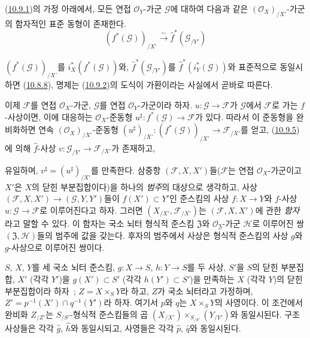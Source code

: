 \begin{proposition}[10.9.5]
\label{I.10.9.5-ko}
(\hyperref[I.10.9.1-ko]{10.9.1})의 가정 아래에서, 모든 연접
$\mathscr{O}_Y$-가군 $\mathscr{G}$에 대하여 다음과 같은
$(\mathscr{O}_X)_{/X'}$-가군의 함자적인 표준 동형이 존재한다.
\[
  (f^*(\mathscr{G}))_{/X'}\xrightarrow{\sim}
  \widehat f^*(\mathscr{G}_{/Y'})
\]
\end{proposition}

$(f^*(\mathscr{G}))_{/X'}$를 $i_X^*(f^*(\mathscr{G}))$와,
$\widehat f^*(\mathscr{G}_{/Y'})$를
$\widehat f^*(i_Y^*(\mathscr{G}))$와 표준적으로 동일시하면
(\hyperref[I.10.8.8-ko]{10.8.8}), 명제는
(\hyperref[I.10.9.2-ko]{10.9.2})의 도식이 가환이라는 사실에서 곧바로
따른다.

\begin{env}[10.9.6]
\label{I.10.9.6-ko}
이제 $\mathscr{F}$를 연접 $\mathscr{O}_X$-가군,
$\mathscr{G}$를 연접 $\mathscr{O}_Y$-가군이라 하자.
$u:\mathscr{G}\to\mathscr{F}$가 $\mathscr{G}$에서 $\mathscr{F}$로
가는 $f$-사상이면, 이에 대응하는 $\mathscr{O}_X$-준동형
$u^\sharp:f^*(\mathscr{G})\to\mathscr{F}$가 있다. 따라서 이 준동형을
완비화하면 연속 $(\mathscr{O}_X)_{/X'}$-준동형
$(u^\sharp)_{/X'}:(f^*(\mathscr{G}))_{/X'}\to\mathscr{F}_{/X'}$를
얻고, (\hyperref[I.10.9.5-ko]{10.9.5})에 의해
$\widehat f$-사상 $v:\mathscr{G}_{/Y'}\to\mathscr{F}_{/X'}$가 존재하고,

유일하며, $v^\sharp=(u^\sharp)_{/X'}$를 만족한다. 삼중항
$(\mathscr{F},X,X')$들($\mathscr{F}$는 연접 $\mathscr{O}_X$-가군이고
$X'$은 $X$의 닫힌 부분집합이다)을 하나의 \emph{범주}의 대상으로
생각하고, 사상
$(\mathscr{F},X,X')\to(\mathscr{G},Y,Y')$들이
$f(X')\subset Y'$인 준스킴의 사상 $f:X\to Y$와
$f$-사상 $u:\mathscr{G}\to\mathscr{F}$로 이루어진다고 하자. 그러면
$(X_{/X'},\mathscr{F}_{/X'})$는 $(\mathscr{F},X,X')$에 관한
\emph{함자}라고 말할 수 있다. 이 함자는 국소 뇌터 형식적 준스킴
$\mathfrak{Z}$와 $\mathscr{O}_{\mathfrak{Z}}$-가군 $\mathscr{H}$로
이루어진 쌍 $(\mathfrak{Z},\mathscr{H})$들의 범주에 값을 갖는다.
후자의 범주에서 사상은 형식적 준스킴의 사상 $g$와 $g$-사상으로
이루어진 쌍이다.
\end{env}

\begin{proposition}[10.9.7]
\label{I.10.9.7-ko}
$S$, $X$, $Y$를 세 국소 뇌터 준스킴,
$g:X\to S$, $h:Y\to S$를 두 사상, $S'$을 $S$의 닫힌 부분집합,
$X'$ (각각 $Y'$)을 $g(X')\subset S'$ (각각
$h(Y')\subset S'$)을 만족하는 $X$ (각각 $Y$)의 닫힌 부분집합이라
하자~; $Z=X\times_S Y$라 하고, $Z$가 국소 뇌터라고 가정하며,
$Z'=p^{-1}(X')\cap q^{-1}(Y')$라 하자. 여기서 $p$와 $q$는
$X\times_S Y$의 사영이다. 이 조건에서 완비화 $Z_{/Z'}$는
$S_{/S'}$-형식적 준스킴들의 곱
$(X_{/X'})\times_{S_{/S'}}(Y_{/Y'})$와 동일시된다. 구조 사상들은
각각 $\widehat g$, $\widehat h$와 동일시되고, 사영들은 각각
$\widehat p$, $\widehat q$와 동일시된다.
\end{proposition}

